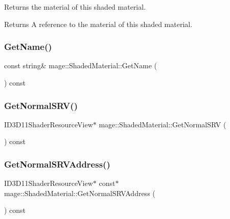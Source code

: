 Returns the material of this shaded material.

\begin{DoxyReturn}{Returns}
A reference to the material of this shaded material. 
\end{DoxyReturn}
\hypertarget{structmage_1_1_shaded_material_af7be0282cc547159cd733475f63eb982}{}\label{structmage_1_1_shaded_material_af7be0282cc547159cd733475f63eb982} 
\subsubsection{\texorpdfstring{Get\+Name()}{GetName()}}
{\footnotesize\ttfamily const string\& mage\+::\+Shaded\+Material\+::\+Get\+Name (\begin{DoxyParamCaption}{ }\end{DoxyParamCaption}) const\hspace{0.3cm}{\ttfamily [noexcept]}}

\hypertarget{structmage_1_1_shaded_material_a5fd4dfbf132fa697fafbbac082ab8bdb}{}\label{structmage_1_1_shaded_material_a5fd4dfbf132fa697fafbbac082ab8bdb} 
\subsubsection{\texorpdfstring{Get\+Normal\+S\+R\+V()}{GetNormalSRV()}}
{\footnotesize\ttfamily I\+D3\+D11\+Shader\+Resource\+View$\ast$ mage\+::\+Shaded\+Material\+::\+Get\+Normal\+S\+RV (\begin{DoxyParamCaption}{ }\end{DoxyParamCaption}) const\hspace{0.3cm}{\ttfamily [noexcept]}}

\hypertarget{structmage_1_1_shaded_material_a2b506a6d1ec48be536cb3318349bb2da}{}\label{structmage_1_1_shaded_material_a2b506a6d1ec48be536cb3318349bb2da} 
\subsubsection{\texorpdfstring{Get\+Normal\+S\+R\+V\+Address()}{GetNormalSRVAddress()}}
{\footnotesize\ttfamily I\+D3\+D11\+Shader\+Resource\+View$\ast$ const$\ast$ mage\+::\+Shaded\+Material\+::\+Get\+Normal\+S\+R\+V\+Address (\begin{DoxyParamCaption}{ }\end{DoxyParamCaption}) const\hspace{0.3cm}{\ttfamily [noexcept]}}

